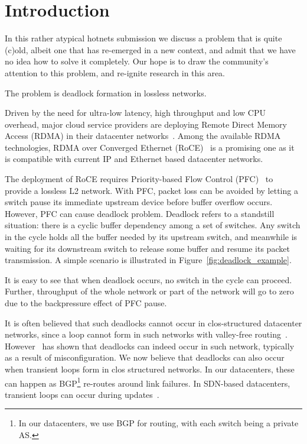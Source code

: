 \secspace
\section{Introduction}
\secspace
\label{sec:intro}

In this rather atypical hotnets submission we discuss a problem that is quite
(c)old, albeit one that has re-emerged in a new context, and admit that we have
no idea how to solve it completely. Our hope is to draw the community's
attention to this problem, and re-ignite research in this area.

The problem is deadlock formation in lossless networks.

Driven by the need for ultra-low latency, high throughput and low CPU overhead,
major cloud service providers are deploying Remote Direct Memory Access (RDMA) in
their datacenter networks~\cite{dcqcn,timely}. Among the
available RDMA technologies,  RDMA over Converged Ethernet (RoCE)~\cite{roce} is
a promising one as it is compatible with current IP and Ethernet based
datacenter networks.

The deployment of RoCE requires Priority-based Flow Control (PFC)~\cite{pfc} to
provide a lossless L2 network. With PFC, packet loss can be avoided by letting a
switch pause its immediate upstream device before buffer overflow occurs.
However, PFC can cause deadlock problem. Deadlock refers to a
standstill situation: there is a cyclic buffer dependency among a set of
switches. Any switch in the cycle holds all the buffer needed by its upstream
switch, and meanwhile is waiting for its downstream switch to release some
buffer and resume its packet transmission. A simple scenario is illustrated in
Figure~\ref{fig:deadlock_example}.

It is easy to see that when deadlock occurs, no switch in the cycle can proceed.
Further, throughput of the whole network or part of the network will go to zero
due to the backpressure effect of PFC pause. 

It is often believed that such deadlocks cannot occur in
clos-structured datacenter networks, since a loop cannot form in such networks
with valley-free routing~\cite{dcqcn}.  However~\cite{rdmascale} has shown that
deadlocks can indeed occur in such network, typically as a result of
misconfiguration. We now believe that deadlocks can also occur when transient
loops form in clos structured networks. In our datacenters, these can happen as
BGP\footnote{In our datacenters, we use BGP for routing, with each switch being
a private AS.} re-routes around link failures. In SDN-based datacenters,
transient loops can occur
during updates~\cite{dionysus}.

